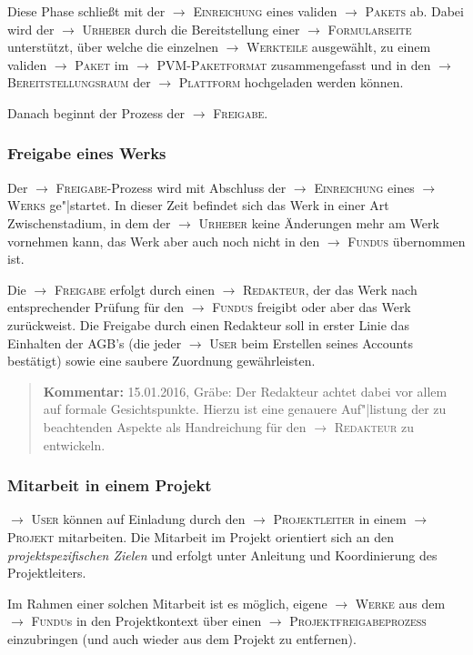 \documentclass[a4paper,11pt]{article}
\newcommand{\Kommentar}[1]{
  \begin{quote}\textbf{Kommentar:} #1 \end{quote}
}
\newcommand{\glossar}[1]{{$\to$ \textsc{#1}}}
\begin{document}
Diese Phase schließt mit der \glossar{Einreichung} eines validen
\glossar{Pakets} ab.  Dabei wird der \glossar{Urheber} durch die Bereitstellung
einer \glossar{Formularseite} unterstützt, über welche die einzelnen
\glossar{Werkteile} ausgewählt, zu einem validen \glossar{Paket} im
\glossar{PVM-Paketformat} zusammengefasst und in den
\glossar{Bereitstellungsraum} der \glossar{Plattform} hochgeladen werden
können.

Danach beginnt der Prozess der \glossar{Freigabe}.

\subsubsection{Freigabe eines Werks}

Der \glossar{Freigabe}-Prozess wird mit Abschluss der \glossar{Einreichung}
eines \glossar{Werks} ge"|startet.  In dieser Zeit befindet sich das Werk in
einer Art Zwischenstadium, in dem der \glossar{Urheber} keine Änderungen mehr
am Werk vornehmen kann, das Werk aber auch noch nicht in den \glossar{Fundus}
übernommen ist.

Die \glossar{Freigabe} erfolgt durch einen \glossar{Redakteur}, der das Werk
nach entsprechender Prüfung für den \glossar{Fundus} freigibt oder aber das
Werk zurückweist. Die Freigabe durch einen Redakteur soll in erster Linie das
Einhalten der AGB's (die jeder \glossar{User} beim Erstellen seines Accounts
bestätigt) sowie eine saubere Zuordnung gewährleisten.

\Kommentar{15.01.2016, Gräbe: Der Redakteur achtet dabei vor allem auf formale
  Gesichtspunkte. Hierzu ist eine genauere Auf"|listung der zu beachtenden
  Aspekte als Handreichung für den \glossar{Redakteur} zu entwickeln.}

\subsubsection{Mitarbeit in einem Projekt}

\glossar{User} können auf Einladung durch den \glossar{Projektleiter} in einem
\glossar{Projekt} mitarbeiten.  Die Mitarbeit im Projekt orientiert sich an den
\emph{projektspezifischen Zielen} und erfolgt unter Anleitung und Koordinierung
des Projektleiters.

Im Rahmen einer solchen Mitarbeit ist es möglich, eigene \glossar{Werke} aus
dem \glossar{Fundu}s in den Projektkontext über einen
\glossar{Projektfreigabeprozess} einzubringen (und auch wieder aus dem Projekt
zu entfernen).
\end{document}
